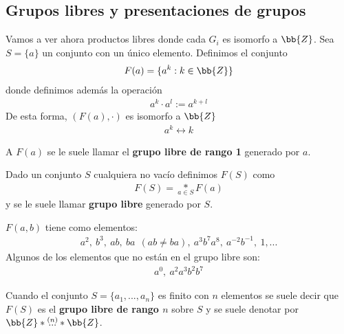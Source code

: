 \subsection{Grupos libres y presentaciones de grupos}

Vamos a ver ahora productos libres donde cada $G_i$ es isomorfo a $\bb{Z}$. Sea $S=\{a\}$ un conjunto con un único elemento. Definimos el conjunto
\begin{gather*}
    F(a)=\{a^k : k\in \bb{Z}\}
\end{gather*}
donde definimos además la operación 
\begin{gather*}
    a^k \cdot a^l := a^{k+l}
\end{gather*}
De esta forma, $(F(a), \cdot)$ es isomorfo a $\bb{Z}$
\begin{gather*}
    a^k \leftrightarrow k
\end{gather*}

\begin{definicion}
    A $F(a)$ se le suele llamar el \textbf{grupo libre de rango 1} generado por $a$.
\end{definicion}

\begin{definicion}
    Dado un conjunto $S$ cualquiera no vacío definimos $F(S)$ como 
    \begin{gather*}
        F(S)=\underset{a\in S}\ast F(a)
    \end{gather*}
    y se le suele llamar \textbf{grupo libre} generado por $S$.
\end{definicion}

\begin{ejemplo}
    $F(a,b)$ tiene como elementos:
    \begin{gather*}
        a^2,\ b^3,\ ab,\ ba\ \ (ab\neq ba) ,\ a^3b^7a^8,\ a^{-2}b^{-1},\ 1,...
    \end{gather*}
    Algunos de los elementos que no están en el grupo libre son:
    \begin{gather*}
        a^0,\ a^2a^3b^2b^7
    \end{gather*}
\end{ejemplo}

\begin{definicion}
    Cuando el conjunto $S=\{a_1,...,a_n\}$ es finito con $n$ elementos se suele decir que $F(S)$ es el \textbf{grupo libre de rango $n$} sobre $S$ y se suele denotar por $\bb{Z}\ast \overset{(n)}{...} \ast \bb{Z}$.
\end{definicion}

